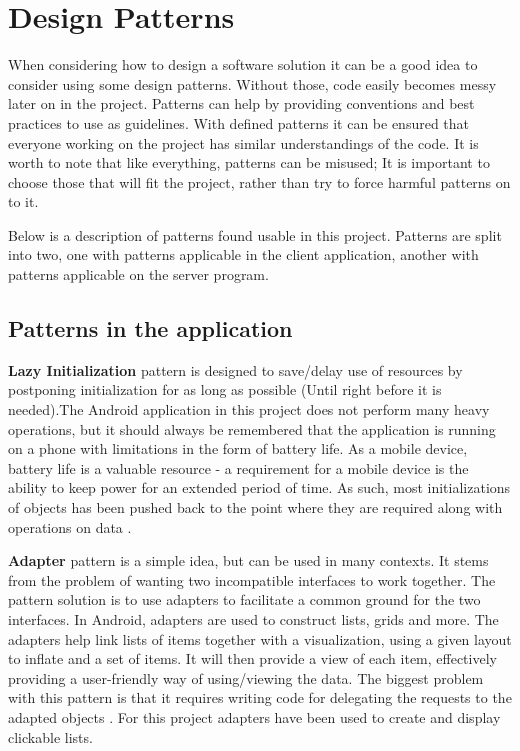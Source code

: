 \section{Design Patterns}
When considering how to design a software solution it can be a good idea to consider using some design patterns. Without those, code easily becomes messy later on in the project. Patterns can help by providing conventions and best practices to use as guidelines. With defined patterns it can be ensured that everyone working on the project has similar understandings of the code. It is worth to note that like everything, patterns can be misused; It is important to choose those that will fit the project, rather than try to force harmful patterns on to it. 

Below is a description of patterns found usable in this project. Patterns are split into two, one with patterns applicable in the client application, another with patterns applicable on the server program.

\subsection{Patterns in the application}

\textbf{Lazy Initialization} pattern is designed to save/delay use of resources by postponing initialization for as long as possible (Until right before it is needed).The Android application in this project does not perform many heavy operations, but it should always be remembered that the application is running on a phone with limitations in the form of battery life. As a mobile device, battery life is a valuable resource - a requirement for a mobile device is the ability to keep power for an extended period of time. As such, most initializations of objects has been pushed back to the point where they are required along with operations on data \cite{lazyInit}.

\textbf{Adapter} pattern is a simple idea, but can be used in many contexts. It stems from the problem of wanting two incompatible interfaces to work together. The pattern solution is to use adapters to facilitate a common ground for the two interfaces. In Android, adapters are used to construct lists, grids and more. The adapters help link lists of items together with a visualization, using a given layout to inflate and a set of items. It will then provide a view of each item, effectively providing a user-friendly way of using/viewing the data. The biggest problem with this pattern is that it requires writing code for delegating the requests to the adapted objects \cite{adappat}. For this project adapters have been used to create and display clickable lists.

